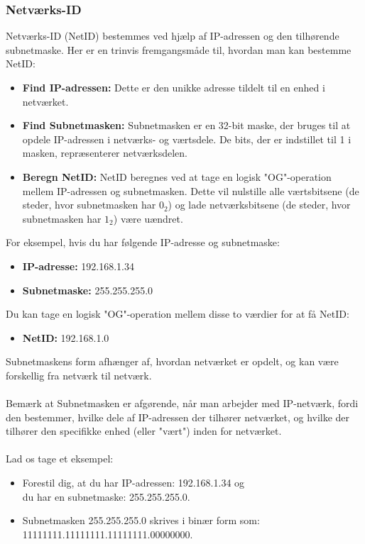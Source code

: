 \subsubsection{Netværks-ID}
Netværks-ID (NetID) bestemmes ved hjælp af IP-adressen og den tilhørende subnetmaske. Her er en trinvis fremgangsmåde til, hvordan man kan bestemme NetID:
\begin{itemize}
	\item \textbf{Find IP-adressen:} Dette er den unikke adresse tildelt til en enhed i netværket.
	
	\item \textbf{Find Subnetmasken:} Subnetmasken er en 32-bit maske, der bruges til at opdele IP-adressen i netværks- og værtsdele. De bits, der er indstillet til 1 i masken, repræsenterer netværksdelen.
	
	\item \textbf{Beregn NetID:} NetID beregnes ved at tage en logisk "OG"-operation mellem IP-adressen og subnetmasken. Dette vil nulstille alle værtsbitsene (de steder, hvor subnetmasken har $0_2$) og lade netværksbitsene (de steder, hvor subnetmasken har $1_2$) være uændret.
\end{itemize}
For eksempel, hvis du har følgende IP-adresse og subnetmaske:
\begin{itemize}
	\item \textbf{IP-adresse:} 192.168.1.34
	\item \textbf{Subnetmaske:} 255.255.255.0
\end{itemize}
Du kan tage en logisk "OG"-operation mellem disse to værdier for at få NetID:
\begin{itemize}
	\item \textbf{NetID:} 192.168.1.0
\end{itemize}
Subnetmaskens form afhænger af, hvordan netværket er opdelt, og kan være forskellig fra netværk til netværk.
\\
\\
Bemærk at Subnetmasken er afgørende, når man arbejder med IP-netværk, fordi den bestemmer, hvilke dele af IP-adressen der tilhører netværket, og hvilke der tilhører den specifikke enhed (eller "vært") inden for netværket.
\\
\\
Lad os tage et eksempel:
\begin{itemize}
	\item Forestil dig, at du har IP-adressen: 192.168.1.34 og\\
	du har en subnetmaske: 255.255.255.0.
	\item Subnetmasken 255.255.255.0 skrives i binær form som:\\
	11111111.11111111.11111111.00000000.
\end{itemize}
